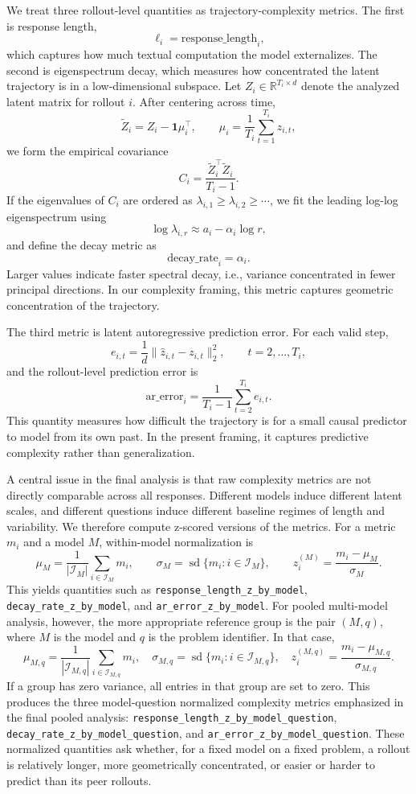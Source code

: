 We treat three rollout-level quantities as trajectory-complexity metrics. The first is response length,
\[
\ell_i = \mathrm{response\_length}_i,
\]
which captures how much textual computation the model externalizes. The second is eigenspectrum decay, which measures how concentrated the latent trajectory is in a low-dimensional subspace. Let \(Z_i \in \mathbb{R}^{T_i \times d}\) denote the analyzed latent matrix for rollout \(i\). After centering across time,
\[
\tilde Z_i = Z_i - \mathbf{1}\mu_i^\top,
\qquad
\mu_i = \frac{1}{T_i} \sum_{t=1}^{T_i} z_{i,t},
\]
we form the empirical covariance
\[
C_i = \frac{\tilde Z_i^\top \tilde Z_i}{T_i - 1}.
\]
If the eigenvalues of \(C_i\) are ordered as \(\lambda_{i,1} \ge \lambda_{i,2} \ge \cdots\), we fit the leading log-log eigenspectrum using
\[
\log \lambda_{i,r} \approx a_i - \alpha_i \log r,
\]
and define the decay metric as
\[
\mathrm{decay\_rate}_i = \alpha_i.
\]
Larger values indicate faster spectral decay, i.e., variance concentrated in fewer principal directions. In our complexity framing, this metric captures geometric concentration of the trajectory.

The third metric is latent autoregressive prediction error. For each valid step,
\[
e_{i,t} = \frac{1}{d}\lVert \hat z_{i,t} - z_{i,t} \rVert_2^2,
\qquad t = 2, \dots, T_i,
\]
and the rollout-level prediction error is
\[
\mathrm{ar\_error}_i = \frac{1}{T_i - 1} \sum_{t=2}^{T_i} e_{i,t}.
\]
This quantity measures how difficult the trajectory is for a small causal predictor to model from its own past. In the present framing, it captures predictive complexity rather than generalization.

A central issue in the final analysis is that raw complexity metrics are not directly comparable across all responses. Different models induce different latent scales, and different questions induce different baseline regimes of length and variability. We therefore compute z-scored versions of the metrics. For a metric \(m_i\) and a model \(M\), within-model normalization is
\[
\mu_M = \frac{1}{|\mathcal I_M|} \sum_{i \in \mathcal I_M} m_i,
\qquad
\sigma_M = \operatorname{sd}\{m_i : i \in \mathcal I_M\},
\qquad
z_i^{(M)} = \frac{m_i - \mu_M}{\sigma_M}.
\]
This yields quantities such as \texttt{response\_length\_z\_by\_model}, \texttt{decay\_rate\_z\_by\_model}, and \texttt{ar\_error\_z\_by\_model}. For pooled multi-model analysis, however, the more appropriate reference group is the pair \((M,q)\), where \(M\) is the model and \(q\) is the problem identifier. In that case,
\[
\mu_{M,q} = \frac{1}{|\mathcal I_{M,q}|} \sum_{i \in \mathcal I_{M,q}} m_i,
\quad
\sigma_{M,q} = \operatorname{sd}\{m_i : i \in \mathcal I_{M,q}\},
\quad
z_i^{(M,q)} = \frac{m_i - \mu_{M,q}}{\sigma_{M,q}}.
\]
If a group has zero variance, all entries in that group are set to zero. This produces the three model-question normalized complexity metrics emphasized in the final pooled analysis: \texttt{response\_length\_z\_by\_model\_question}, \texttt{decay\_rate\_z\_by\_model\_question}, and \texttt{ar\_error\_z\_by\_model\_question}. These normalized quantities ask whether, for a fixed model on a fixed problem, a rollout is relatively longer, more geometrically concentrated, or easier or harder to predict than its peer rollouts.

